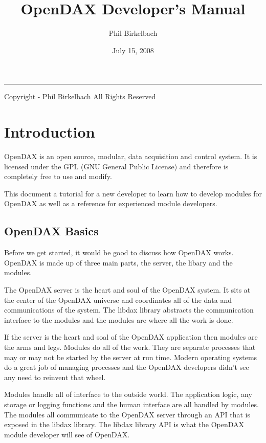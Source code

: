 \documentclass[10pt,letterpaper]{report}
\title{OpenDAX Developer's Manual}
\date{July 15, 2008}
\author{Phil Birkelbach}
\makeatletter
\renewcommand{\maketitle}{\begin{titlepage}%
    \let\footnotesize\small
    \let\footnoterule\relax
    \parindent \z@
    \reset@font
    \null\vfil
    \begin{flushleft}
      \huge \@title
    \end{flushleft}
    \par
    \hrule height 1pt
    \par
    \begin{flushright}
      \LARGE \@author \par
    \end{flushright}
    \vskip 60\p@
    \vfil\null
  \end{titlepage}%
  \setcounter{footnote}{0}%
}
\makeatother
\begin{document}
\maketitle
\begin{flushleft}
Copyright  - Phil Birkelbach\linebreak
All Rights Reserved

\end{flushleft}

\tableofcontents
\newpage

\chapter{Introduction}
OpenDAX is an open source, modular, data acquisition and control system. It is licensed under the GPL (GNU General Public License) and therefore is completely free to use and modify.

This document a tutorial for a new developer to learn how to develop modules for OpenDAX as well as a reference for experienced module developers.

\section{OpenDAX Basics}
Before we get started, it would be good to discuss how OpenDAX works.  OpenDAX is made up of three main parts, the server, the libary and the modules.

The OpenDAX server is the heart and soul of the OpenDAX system.  It sits at the center of the OpenDAX universe and coordinates all of the data and communications of the system.  The libdax library abstracts the communication interface to the modules and the modules are where all the work is done.

If the server is the heart and soal of the OpenDAX application then modules are the arms and legs.  Modules do all of the work.  They are separate processes that may or may not be started by the server at run time.  Modern operating systems do a great job of managing processes and the OpenDAX developers didn't see any need to reinvent that wheel.  

Modules handle all of interface to the outside world.  The application logic, any storage or logging functions and the human interface are all handled by modules.  The modules all communicate to the OpenDAX server through an API that is exposed in the libdax library.  The libdax library API is what the OpenDAX module developer will see of OpenDAX.
\end{document}
